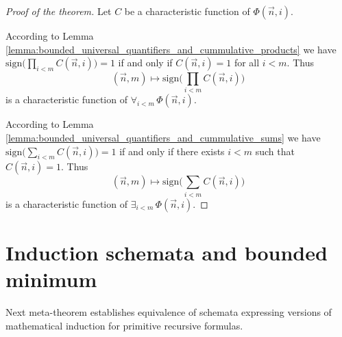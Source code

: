 \documentclass[10pt]{amsart}
\newcommand{\mforall}{\boldsymbol{\forall}}
\newcommand{\mexists}{\boldsymbol{\exists}}
\newcommand{\mle}{\boldsymbol{<}}
\newcommand{\meq}{\boldsymbol{=}}
\begin{document}
\begin{proof}[Proof of the theorem]
	Let $C$ be a characteristic function of $\Phi(\vec{n},i)$.

	According to Lemma \ref{lemma:bounded_universal_quantifiers_and_cummulative_products} we have $\mathrm{sign}\bigg(\prod_{i \mle m}C(\vec{n},i)\bigg) \meq 1$ if and only if $C(\vec{n},i) \meq 1$ for all $i \mle m$. Thus
	$$(\vec{n},m) \mapsto \mathrm{sign}\bigg(\prod_{i \mle m}C(\vec{n},i)\bigg)$$
	is a characteristic function of $\mforall_{i \mle m}\,\Phi(\vec{n},i)$.

	According to Lemma \ref{lemma:bounded_universal_quantifiers_and_cummulative_sums} we have $\mathrm{sign}\bigg(\sum_{i \mle m}C(\vec{n},i)\bigg) \meq 1$ if and only if there exists $i \mle m$ such that $C(\vec{n},i) \meq 1$. Thus
	$$(\vec{n},m) \mapsto \mathrm{sign}\bigg(\sum_{i \mle m}C(\vec{n},i)\bigg)$$
	is a characteristic function of $\mexists_{i \mle m}\,\Phi(\vec{n},i)$.
\end{proof}

\section{Induction schemata and bounded minimum}
\noindent
Next meta-theorem establishes equivalence of schemata expressing versions of mathematical induction for primitive recursive formulas.
\end{document}
